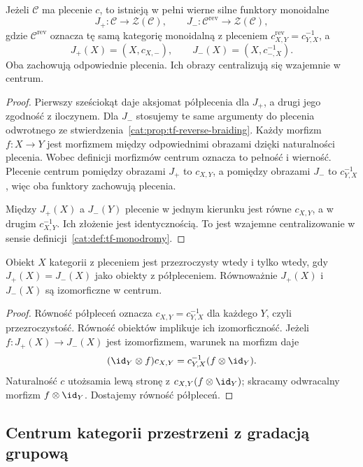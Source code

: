 \begin{stwierdzenie}\label{cat:prop:tf-center-embeddings}
Jeżeli $\mathcal C$ ma plecenie $c$, to istnieją w pełni wierne silne funktory monoidalne
\[
 J_+:\mathcal C\to\mathcal Z(\mathcal C),\qquad
 J_-:\mathcal C^{\mathrm{rev}}\to\mathcal Z(\mathcal C),
\]
gdzie $\mathcal C^{\mathrm{rev}}$ oznacza tę samą kategorię monoidalną z pleceniem $c^{\mathrm{rev}}_{X,Y}=c_{Y,X}^{-1}$, a
\[
 J_+(X)=(X,c_{X,-}),\qquad
 J_-(X)=(X,c_{-,X}^{-1}).
\]
Oba zachowują odpowiednie plecenia. Ich obrazy centralizują się wzajemnie w centrum.
\end{stwierdzenie}
\begin{proof}
Pierwszy sześciokąt daje aksjomat półplecenia dla $J_+$, a drugi jego zgodność z iloczynem. Dla $J_-$ stosujemy te same argumenty do plecenia odwrotnego ze stwierdzenia~\ref{cat:prop:tf-reverse-braiding}. Każdy morfizm $f:X\to Y$ jest morfizmem między odpowiednimi obrazami dzięki naturalności plecenia. Wobec definicji morfizmów centrum oznacza to pełność i wierność. Plecenie centrum pomiędzy obrazami $J_+$ to $c_{X,Y}$, a pomiędzy obrazami $J_-$ to $c_{Y,X}^{-1}$, więc oba funktory zachowują plecenia.

Między $J_+(X)$ a $J_-(Y)$ plecenie w jednym kierunku jest równe $c_{X,Y}$, a w drugim $c_{X,Y}^{-1}$. Ich złożenie jest identycznością. To jest wzajemne centralizowanie w sensie definicji~\ref{cat:def:tf-monodromy}.
\end{proof}

\begin{wniosek}\label{cat:cor:tf-center-intersection}
Obiekt $X$ kategorii z pleceniem jest przezroczysty wtedy i tylko wtedy, gdy $J_+(X)=J_-(X)$ jako obiekty z półpleceniem. Równoważnie $J_+(X)$ i $J_-(X)$ są izomorficzne w centrum.
\end{wniosek}
\begin{proof}
Równość półpleceń oznacza $c_{X,Y}=c_{Y,X}^{-1}$ dla każdego $Y$, czyli przezroczystość. Równość obiektów implikuje ich izomorficzność. Jeżeli $f:J_+(X)\to J_-(X)$ jest izomorfizmem, warunek na morfizm daje
\[
 (\id_Y\otimes f)c_{X,Y}=c_{Y,X}^{-1}(f\otimes\id_Y).
\]
Naturalność $c$ utożsamia lewą stronę z $c_{X,Y}(f\otimes\id_Y)$; skracamy odwracalny morfizm $f\otimes\id_Y$. Dostajemy równość półpleceń.
\end{proof}

\subsection{Centrum kategorii przestrzeni z gradacją grupową}

